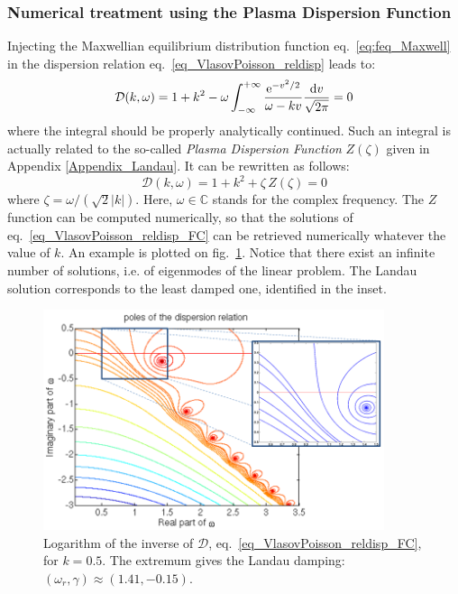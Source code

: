\documentclass[11pt]{article}
\newcommand{\dd}{\textrm d}
\newcommand{\ee}{\textrm e}
\begin{document}
\subsubsection{Numerical treatment using the Plasma Dispersion Function}

Injecting the Maxwellian equilibrium distribution function eq.~\eqref{eq:feq_Maxwell} in the dispersion relation eq.~\eqref{eq_VlasovPoisson_reldisp} leads to:
\begin{equation*}
  \mathcal{D} (k,\omega)= 1 + k^2 - \omega \int_{-\infty}^{+\infty}
  \frac{\ee^{-v^2/2}}{\omega - kv} \frac{\dd v}{\sqrt{2\pi}} = 0
\end{equation*}
where the integral should be properly analytically continued. Such an integral is actually related to the so-called \emph{Plasma Dispersion Function} $Z(\zeta)$ given in Appendix \ref{Appendix_Landau}. It can be rewritten as follows:
\begin{equation}
  \label{eq_VlasovPoisson_reldisp_FC}
  \mathcal{D} (k,\omega)= 1 + k^2 + \zeta \, Z(\zeta) = 0
\end{equation}
where $\zeta = \omega/(\sqrt{2}|k|)$. Here, $\omega \in \mathbb{C}$ stands for the complex frequency. The $Z$ function can be computed numerically, so that the solutions of eq.~\eqref{eq_VlasovPoisson_reldisp_FC} can be retrieved numerically whatever the value of $k$. An example is plotted on fig.~\ref{fig_Landau_DispRel}. Notice that there exist an infinite number of solutions, i.e. of eigenmodes of the linear problem. The Landau solution corresponds to the least damped one, identified in the inset.


\begin{figure}[!h]
	\begin{center}
		\includegraphics[width=10cm]{Figures/Fig_Landau_poles_zoom.png}
		\caption{Logarithm of the inverse of $\mathcal{D}$, eq.~\eqref{eq_VlasovPoisson_reldisp_FC}, for $k = 0.5$. The extremum gives the Landau damping: $(\omega_r,\gamma) \approx (1.41, -0.15)$.} \label{fig_Landau_DispRel}
	\end{center}
\end{figure}
\end{document}
